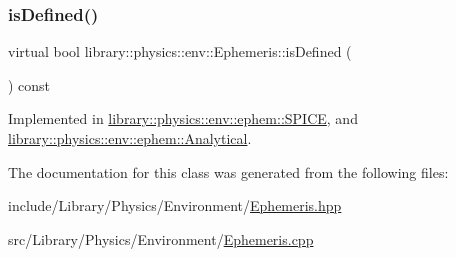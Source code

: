 \subsubsection{\texorpdfstring{is\+Defined()}{isDefined()}}
{\footnotesize\ttfamily virtual bool library\+::physics\+::env\+::\+Ephemeris\+::is\+Defined (\begin{DoxyParamCaption}{ }\end{DoxyParamCaption}) const\hspace{0.3cm}{\ttfamily [pure virtual]}}



Implemented in \hyperlink{classlibrary_1_1physics_1_1env_1_1ephem_1_1_s_p_i_c_e_a54fb3fb8768a72f515231dac083eb9cb}{library\+::physics\+::env\+::ephem\+::\+S\+P\+I\+CE}, and \hyperlink{classlibrary_1_1physics_1_1env_1_1ephem_1_1_analytical_a0c0fe5d8326ba439bb0b51e7536ab0fd}{library\+::physics\+::env\+::ephem\+::\+Analytical}.



The documentation for this class was generated from the following files\+:\begin{DoxyCompactItemize}
\item 
include/\+Library/\+Physics/\+Environment/\hyperlink{_ephemeris_8hpp}{Ephemeris.\+hpp}\item 
src/\+Library/\+Physics/\+Environment/\hyperlink{_ephemeris_8cpp}{Ephemeris.\+cpp}\end{DoxyCompactItemize}

